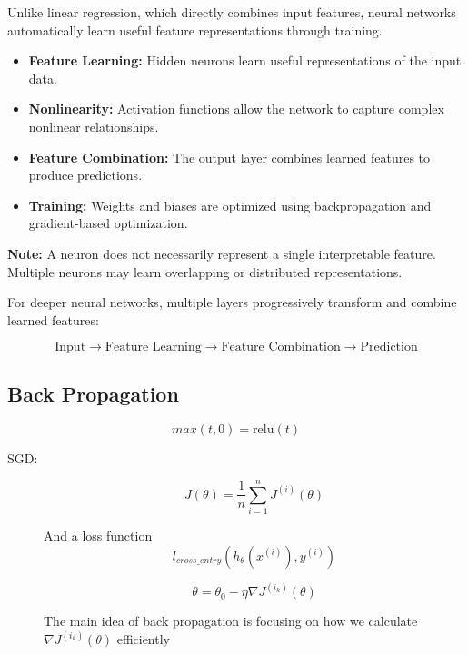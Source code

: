 \documentclass[12pt,a4paper]{report}
\begin{document}
Unlike linear regression, which directly combines input features, neural networks automatically learn useful feature representations through training.

\begin{itemize}
    \item \textbf{Feature Learning:} Hidden neurons learn useful representations of the input data.
    
    \item \textbf{Nonlinearity:} Activation functions allow the network to capture complex nonlinear relationships.
    
    \item \textbf{Feature Combination:} The output layer combines learned features to produce predictions.
    
    \item \textbf{Training:} Weights and biases are optimized using backpropagation and gradient-based optimization.
\end{itemize}

\textbf{Note:} A neuron does not necessarily represent a single interpretable feature. Multiple neurons may learn overlapping or distributed representations.

For deeper neural networks, multiple layers progressively transform and combine learned features:

\[
\boxed{
\text{Input} \rightarrow
\text{Feature Learning} \rightarrow
\text{Feature Combination} \rightarrow
\text{Prediction}
}
\]


\subsection{Back Propagation}

\[
    max(t, 0) = \text{relu} (t)
\]

\begin{description}
    \item[SGD: ]  

    \[
        J(\theta) = \frac{1}{n} \sum_{i = 1}^n J^{(i)}(\theta)
    \]

 And a loss function
    \[
        l_{cross\_entry} (h_\theta(x^{(i)}), y^{(i)})
    \]

    \[
        \theta = \theta_0 - \eta \nabla J^{(i_k)}(\theta)
    \]

 The main idea of back propagation is focusing on how we calculate $\nabla J^{(i_k)}(\theta)$ efficiently
\end{description}
\end{document}
